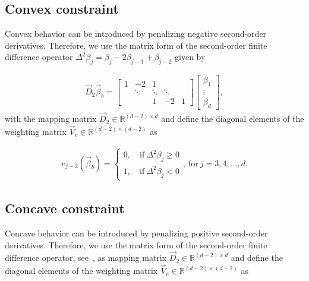 \subsection{Convex constraint} \label{subsec:ConvC}

Convex behavior can be introduced by penalizing negative second-order derivatives. Therefore, we  use the matrix form of the second-order finite difference operator $\Delta^2 \beta_j = \beta_j - 2\beta_{j-1} + \beta_{j-2}$ given by

\begin{align} \label{eq:FD-operator-order-2}
	\vec{D}_2 \vec{\beta}_b = 
	\begin{bmatrix} 
		1& -2     & 1   \\  
		 & \ddots & \ddots  & \ddots \\ 
		 &        & 1       & -2     & 1 
	\end{bmatrix} \begin{bmatrix}
		\beta_1 \\
		\vdots \\
		\beta_d
	\end{bmatrix},
\end{align}
%
with the mapping matrix $\vec{D}_2 \in \mathbb{R}^{(d-2)\times d}$ and define the diagonal elements of the weighting matrix $\vec{V}_c \in \mathbb{R}^{(d-2) \times (d-2)}$ as

\begin{align} \label{eq:weighting-matrix-conv-diagonal}
	v_{j-2}(\vec{\beta}_b) = \begin{cases}
		0, \quad \text{if} \ \Delta^2\beta_j \ge 0 \\ 
		1, \quad \text{if} \ \Delta^2\beta_j < 0
	\end{cases}, \ \text{for} \ j=3,4, \dots, d.
\end{align}

\subsection{Concave constraint} \label{subsec:ConcC}

Concave behavior can be introduced by penalizing positive second-order derivatives. Therefore, we  use the matrix form of the second-order finite difference operator, see~, as mapping matrix $\vec{D}_2 \in \mathbb{R}^{(d-2)\times d}$ and define the diagonal elements of the weighting matrix $\vec{V}_c \in \mathbb{R}^{(d-2) \times (d-2)}$ as

